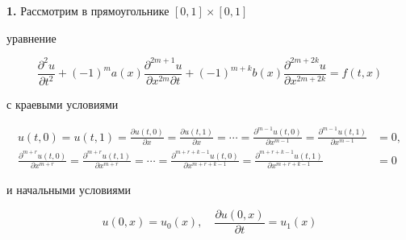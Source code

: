 

\maketitle  


\label{begin}  


 


 


{\bf 1.} Рассмотрим в прямоугольнике $[0,1]\times[0,1]$ 


уравнение 


\begin{equation} 


\frac{\partial^2 u}{\partial t^2}+(-1)^ma(x) 


\frac{\partial^{2m+1}u}{\partial x^{2m}\partial t}+ 


(-1)^{m+k}b(x) 


\frac{\partial^{2m+2k}u}{\partial x^{2m+2k}}=f(t,x) 


\end{equation} 


с краевыми условиями 


\begin{align} 


u(t,0)=u(t,1)=\frac{\partial u(t,0)}{\partial x}= 


\frac{\partial u(t,1)}{\partial x}=\dotsb= 


\frac{\partial^{m-1}u(t,0)}{\partial x^{m-1}}= 


\frac{\partial ^{m-1}u(t,1)}{\partial x^{m-1}}&=0,\\ 


% 


\frac{\partial^{m+r}u(t,0)}{\partial x^{m+r}}= 


\frac{\partial^{m+r}u(t,1)}{\partial x^{m+r}}=\dotsb= 


\frac{\partial^{m+r+k-1}u(t,0)}{\partial x^{m+r+k-1}}= 


\frac{\partial^{m+r+k-1}u(t,1)}{\partial x^{m+r+k-1}}&=0 


\end{align} 


и начальными условиями 


\begin{equation} 


u(0,x)=u_0(x),\quad \frac{\partial u(0,x)}{\partial t}=u_1(x) 


\end{equation} 


